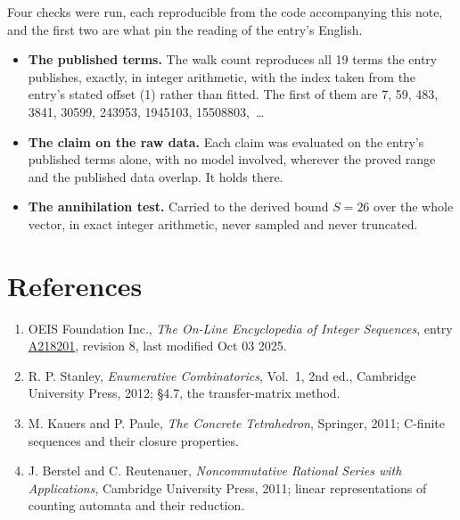 \documentclass[11pt]{article}
\theoremstyle{definition}
\begin{document}
Four checks were run, each reproducible from the code accompanying this note, and the first two are what pin the reading of the entry's English.

\begin{itemize}

\item {\bfseries The published terms.} The walk count reproduces all 19 terms the entry publishes, exactly, in integer arithmetic, with the index taken from the entry's stated offset (1) rather than fitted. The first of them are 7, 59, 483, 3841, 30599, 243953, 1945103, 15508803,~\dots

\item {\bfseries The claim on the raw data.} Each claim was evaluated on the entry's published terms alone, with no model involved, wherever the proved range and the published data overlap. It holds there.

\item {\bfseries The annihilation test.} Carried to the derived bound $S = 26$ over the whole vector, in exact integer arithmetic, never sampled and never truncated.

\end{itemize}

\section{References}

\begin{enumerate}

\item OEIS Foundation Inc., \emph{The On-Line Encyclopedia of Integer Sequences}, entry \href{https://oeis.org/A218201}{A218201}, revision 8, last modified Oct 03 2025.

\item R. P. Stanley, \emph{Enumerative Combinatorics}, Vol.~1, 2nd ed., Cambridge University Press, 2012; \S4.7, the transfer-matrix method.

\item M. Kauers and P. Paule, \emph{The Concrete Tetrahedron}, Springer, 2011; C-finite sequences and their closure properties.

\item J. Berstel and C. Reutenauer, \emph{Noncommutative Rational Series with Applications}, Cambridge University Press, 2011; linear representations of counting automata and their reduction.

\end{enumerate}
\end{document}

